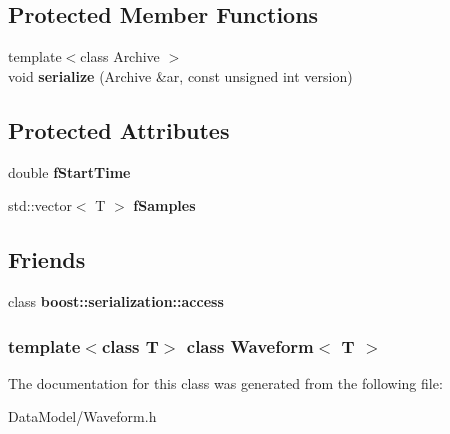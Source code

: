 \subsection*{Protected Member Functions}
\begin{DoxyCompactItemize}
\item 
\hypertarget{classWaveform_aecca5522c214d2c832dbfb8be9ee1d90}{
{\footnotesize template$<$class Archive $>$ }\\void {\bfseries serialize} (Archive \&ar, const unsigned int version)}
\label{classWaveform_aecca5522c214d2c832dbfb8be9ee1d90}

\end{DoxyCompactItemize}
\subsection*{Protected Attributes}
\begin{DoxyCompactItemize}
\item 
\hypertarget{classWaveform_a2d586b50632273b1e10a3437a3140be0}{
double {\bfseries fStartTime}}
\label{classWaveform_a2d586b50632273b1e10a3437a3140be0}

\item 
\hypertarget{classWaveform_a3b535d8f472652894cd75933b1268fb4}{
std::vector$<$ T $>$ {\bfseries fSamples}}
\label{classWaveform_a3b535d8f472652894cd75933b1268fb4}

\end{DoxyCompactItemize}
\subsection*{Friends}
\begin{DoxyCompactItemize}
\item 
\hypertarget{classWaveform_ac98d07dd8f7b70e16ccb9a01abf56b9c}{
class {\bfseries boost::serialization::access}}
\label{classWaveform_ac98d07dd8f7b70e16ccb9a01abf56b9c}

\end{DoxyCompactItemize}
\subsubsection*{template$<$class T$>$ class Waveform$<$ T $>$}



The documentation for this class was generated from the following file:\begin{DoxyCompactItemize}
\item 
DataModel/Waveform.h\end{DoxyCompactItemize}
